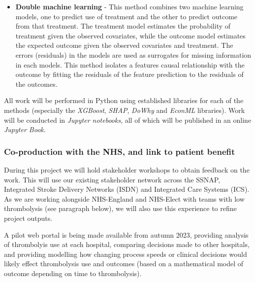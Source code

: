 \begin{itemize}
    \item \textbf{Double machine learning} \cite{chernozhukov_doubledebiased_2017} - This method combines two machine learning models, one to predict use of treatment and the other to predict outcome from that treatment. The treatment model estimates the probability of treatment given the observed covariates, while the outcome model estimates the expected outcome given the observed covariates and treatment. The errors (residuals) in the models are used as surrogates for missing information in each models. This method isolates a features causal relationship with the outcome by fitting the residuals of the feature prediction to the residuals of the outcomes.
\end{itemize}

All work will be performed in Python using established libraries for each of the methods (especially the \textit{XGBoost}, \textit{SHAP}, \textit{DoWhy} and \textit{EconML} libraries). Work will be conducted in \textit{Jupyter notebooks}, all of which will be published in an online \textit{Jupyter Book}.

\subsubsection{Co-production with the NHS, and link to patient benefit}

During this project we will hold stakeholder workshops to obtain feedback on the work. This will use our existing stakeholder network across the SSNAP, Integrated Stroke Delivery Networks (ISDN) and Integrated Care Systems (ICS). As we are working alongside NHS-England and NHS-Elect with teams with low thrombolysis (see paragraph below), we will also use this experience to refine project outputs.

A pilot web portal is being made available from autumn 2023, providing analysis of thrombolyis use at each hospital, comparing decisions made to other hospitals, and providing modelling how changing process speeds or clinical decisions would likely effect thrombolysis use and outcomes (based on a mathematical model of outcome depending on time to thrombolysis).


